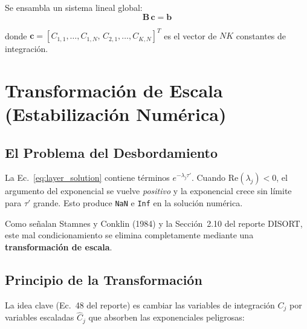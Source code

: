 \documentclass[a4paper,11pt]{article}
\begin{document}
Se ensambla un sistema lineal global:
\begin{equation}\label{eq:global_system}
    \mathbf{B}\,\mathbf{c} = \mathbf{b}
\end{equation}

donde $\mathbf{c} = [C_{1,1},\ldots,C_{1,N},\,C_{2,1},\ldots,C_{K,N}]^T$ es el
vector de $NK$ constantes de integraci\'on.


\section{Transformaci\'on de Escala (Estabilizaci\'on Num\'erica)}\label{sec:scaling}

\subsection{El Problema del Desbordamiento}

La Ec.~\eqref{eq:layer_solution} contiene t\'erminos $e^{-\lambda_j\tau'}$.
Cuando $\text{Re}(\lambda_j) < 0$, el argumento del exponencial se vuelve
\emph{positivo} y la exponencial crece sin l\'imite para $\tau'$ grande.
Esto produce \texttt{NaN} e \texttt{Inf} en la soluci\'on num\'erica.

Como se\~nalan Stamnes y Conklin (1984) y la Secci\'on~2.10 del reporte DISORT,
este mal condicionamiento se elimina completamente mediante una
\textbf{transformaci\'on de escala}.

\subsection{Principio de la Transformaci\'on}

La idea clave (Ec.~48 del reporte) es cambiar las variables de integraci\'on
$C_j$ por variables escaladas $\hat{C}_j$ que absorben las exponenciales
peligrosas:
\end{document}
